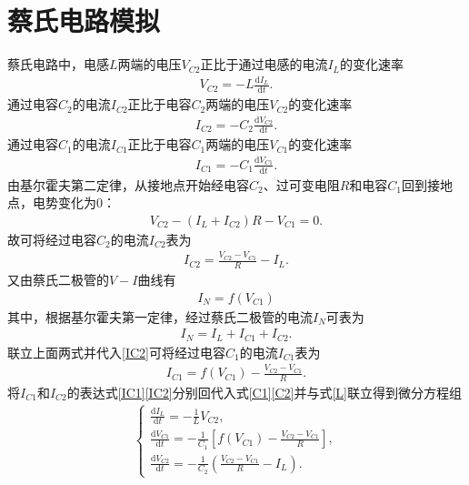 \documentclass{assignment}
\begin{document}
\section{蔡氏电路模拟}
蔡氏电路中，电感$L$两端的电压$V_{C2}$正比于通过电感的电流$I_L$的变化速率
\begin{align}
    \label{L}
    V_{C2}=-L\frac{\mathrm{d}I_L}{\mathrm{d}t}.
\end{align}
通过电容$C_2$的电流$I_{C2}$正比于电容$C_2$两端的电压$V_{C2}$的变化速率
\begin{align}
    \label{C2}
    I_{C2}=-C_2\frac{\mathrm{d}V_{C2}}{\mathrm{d}t}.
\end{align}
通过电容$C_1$的电流$I_{C1}$正比于电容$C_1$两端的电压$V_{C1}$的变化速率
\begin{align}
    \label{C1}
    I_{C1}=-C_1\frac{\mathrm{d}V_{C1}}{\mathrm{d}t}.
\end{align}
由基尔霍夫第二定律，从接地点开始经电容$C_2$、过可变电阻$R$和电容$C_1$回到接地点，电势变化为$0$：
\begin{align}
    V_{C2}-(I_L+I_{C2})R-V_{C1}=0.
\end{align}
故可将经过电容$C_2$的电流$I_{C2}$表为
\begin{align}
    \label{IC2}
    I_{C2}=\frac{V_{C2}-V_{C1}}{R}-I_L.
\end{align}
又由蔡氏二极管的$V-I$曲线有
\begin{align}
    I_N=f(V_{C1})
\end{align}
其中，根据基尔霍夫第一定律，经过蔡氏二极管的电流$I_N$可表为
\begin{align}
    I_N=I_L+I_{C1}+I_{C2}.
\end{align}
联立上面两式并代入\eqref{IC2}可将经过电容$C_1$的电流$I_{C1}$表为
\begin{align}
    \label{IC1}
    I_{C1}=f(V_{C1})-\frac{V_{C2}-V_{C1}}{R}.
\end{align}
将$I_{C1}$和$I_{C2}$的表达式\eqref{IC1}\eqref{IC2}分别回代入式\eqref{C1}\eqref{C2}并与式\eqref{L}联立得到微分方程组
\begin{align}
    \left\{\begin{array}{l}
        \frac{\mathrm{d}I_L}{\mathrm{d}t}=-\frac{1}{L}V_{C2},\\
        \frac{\mathrm{d}V_{C1}}{\mathrm{d}t}=-\frac{1}{C_1}\left[f(V_{C1})-\frac{V_{C2}-V_{C1}}{R}\right],\\
        \frac{\mathrm{d}V_{C2}}{\mathrm{d}t}=-\frac{1}{C_2}\left(\frac{V_{C2}-V_{C1}}{R}-I_L\right).
    \end{array}\right.
\end{align}
\end{document}
